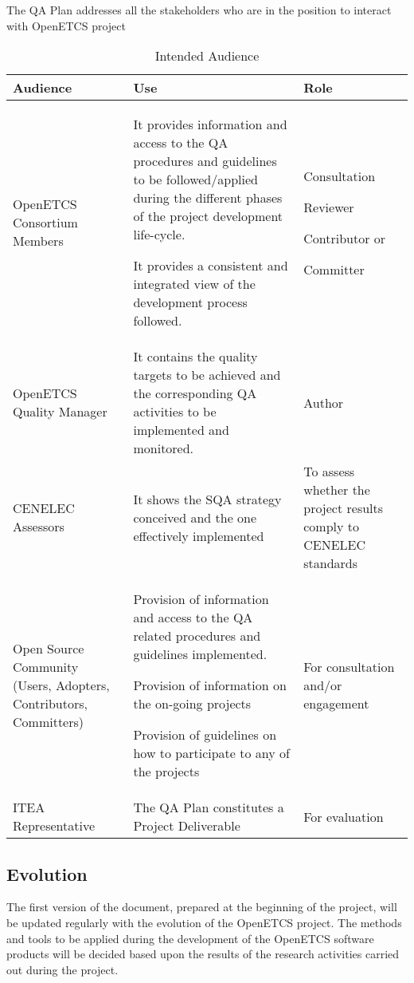 \documentclass{template/openetcs_article}
\begin{document}
The QA Plan addresses all the stakeholders who are in the position to interact with OpenETCS project


\begin{table} [H]
\begin{tabular}{|m{3cm}|m{9cm}|m{3cm}|}
\hline
\rowcolor{myblue}
Audience &
Use &
Role\\\hline
OpenETCS Consortium Members &
It provides information and access to the QA procedures and guidelines to be followed/applied during the different phases of the project development life-cycle.

It provides a consistent and integrated view of the development process followed.
&
Consultation

Reviewer

Contributor or 

Committer
\\\hline
OpenETCS Quality Manager &
It contains the quality targets to be achieved and the corresponding QA activities to be implemented and monitored. &
Author\\\hline
CENELEC Assessors &
It shows the SQA strategy conceived and the one effectively implemented &
To assess whether the project results comply to CENELEC standards\\\hline
Open Source Community (Users, Adopters, Contributors, Committers) &
Provision of information and access to the QA related procedures and guidelines implemented.

Provision of information on the on-going projects

Provision of guidelines on how to participate to any of the projects
&
For consultation and/or engagement\\\hline
ITEA Representative &
The QA Plan constitutes a Project Deliverable &
For evaluation \\\hline
\end{tabular}
\caption{Intended Audience}
\end{table}


\subsection{Evolution}

The first version of the document, prepared at the beginning of the project, will be updated regularly with the evolution of the OpenETCS project. The methods and tools to be applied during the development of the OpenETCS software products will be decided based upon the results of the research activities carried out during the project. 
\end{document}
